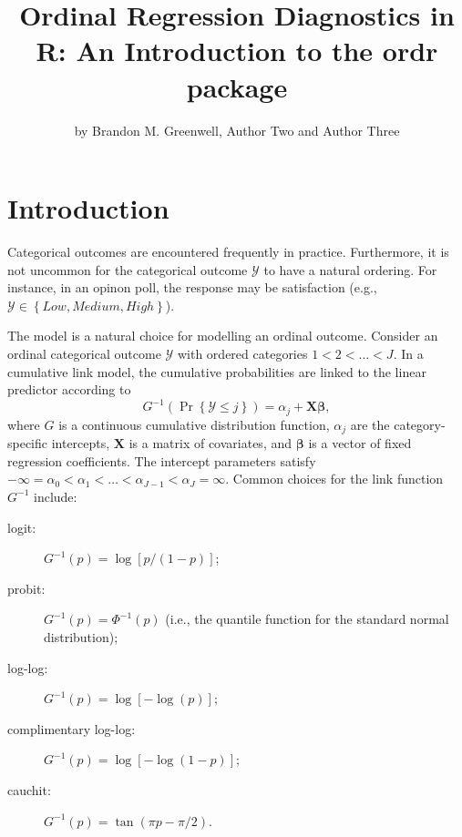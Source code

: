 \title{Ordinal Regression Diagnostics in R: An Introduction to the ordr package}
\author{by Brandon M. Greenwell, Author Two and Author Three}

\maketitle



\section{Introduction}

Categorical outcomes are encountered frequently in practice. Furthermore, it is not uncommon for the categorical outcome $\mathcal{Y}$ to have a natural ordering. For instance, in an opinon poll, the response may be satisfaction (e.g., $\mathcal{Y} \in \left\{Low, Medium, High\right\}$).

The  model is a natural choice for modelling an ordinal outcome. Consider an ordinal categorical outcome $\mathcal{Y}$ with ordered categories $1 < 2 < \dots < J$. In a cumulative link model, the cumulative probabilities are linked to the linear predictor according to
\begin{equation}
\label{eqn:clm}
  G^{-1}\left(\Pr\left\{\mathcal{Y} \le j\right\}\right) = \alpha_j + \boldsymbol{X}\boldsymbol{\beta},
\end{equation}
where $G$ is a continuous cumulative distribution function, $\alpha_j$ are the category-specific intercepts, $\boldsymbol{X}$ is a matrix of covariates, and $\boldsymbol{\beta}$ is a vector of fixed regression coefficients. The intercept parameters satisfy $-\infty = \alpha_0 < \alpha_1 < \dots < \alpha_{J-1} < \alpha_J = \infty$. Common choices for the link function $G^{-1}$ include:
\begin{description}
  \item[logit:] $G^{-1}\left(p\right) = \log\left[p / \left(1 - p\right)\right]$;
  \item[probit:] $G^{-1}\left(p\right) = \Phi^{-1}\left(p\right)$ (i.e., the quantile function for the standard normal distribution);
  \item[log-log:] $G^{-1}\left(p\right) = \log\left[-\log\left(p\right)\right]$;
  \item[complimentary log-log:] $G^{-1}\left(p\right) = \log\left[-\log\left(1 - p\right)\right]$;
  \item[cauchit:] $G^{-1}\left(p\right) = \tan\left(\pi p - \pi / 2\right)$.
\end{description}

